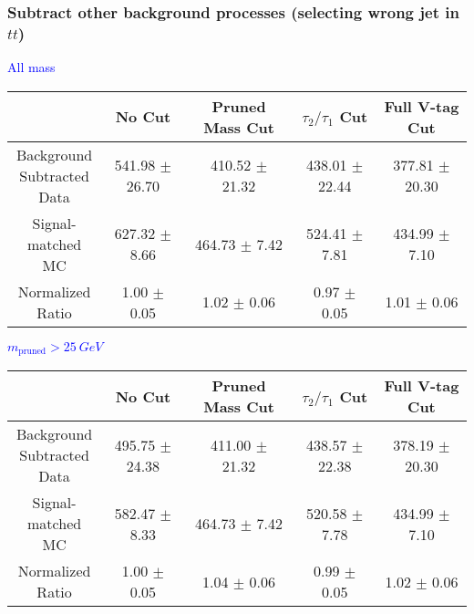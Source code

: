 \documentclass{beamer}
\begin{document}
\begin{frame}
  \frametitle{Subtract other background processes (selecting wrong jet in $tt$)}
  \begin{adjustwidth}{-1.5em}{-1.5em}
    \centering
    \vspace{6pt}
    \textcolor{blue}{All mass}
    \vspace{6pt}

    {\scriptsize
      \begin{tabular}{c | c | c | c | c}
\hline
 & No Cut & Pruned Mass Cut & $\tau_2/\tau_1$ Cut & Full V-tag Cut \\
\hline
\makecell{Background \\ Subtracted \\ Data} & 541.98 $\pm$ 26.70 & 410.52 $\pm$ 21.32 & 438.01 $\pm$ 22.44 & 377.81 $\pm$ 20.30 \\
\makecell{Signal-\\ matched MC} & 627.32 $\pm$ 8.66 & 464.73 $\pm$ 7.42 & 524.41 $\pm$ 7.81 & 434.99 $\pm$ 7.10 \\
\hline
\makecell{Normalized \\ Ratio} & 1.00 $\pm$ 0.05 & 1.02 $\pm$ 0.06 & 0.97 $\pm$ 0.05 & 1.01 $\pm$ 0.06 \\
\hline
      \end{tabular}
    }

    \vspace{6pt}
    \textcolor{blue}{$m_\text{pruned} > \SI{25}{GeV}$}
    \vspace{6pt}

    {\scriptsize
      \begin{tabular}{c | c | c | c | c}
\hline
 & No Cut & Pruned Mass Cut & $\tau_2/\tau_1$ Cut & Full V-tag Cut \\
\hline
\makecell{Background \\ Subtracted \\ Data} & 495.75 $\pm$ 24.38 & 411.00 $\pm$ 21.32 & 438.57 $\pm$ 22.38 & 378.19 $\pm$ 20.30 \\
\makecell{Signal-\\ matched MC} & 582.47 $\pm$ 8.33 & 464.73 $\pm$ 7.42 & 520.58 $\pm$ 7.78 & 434.99 $\pm$ 7.10 \\
\hline
\makecell{Normalized \\ Ratio} & 1.00 $\pm$ 0.05 & 1.04 $\pm$ 0.06 & 0.99 $\pm$ 0.05 & 1.02 $\pm$ 0.06 \\
\hline
      \end{tabular}
    }
  \end{adjustwidth}
\end{frame}
\end{document}
